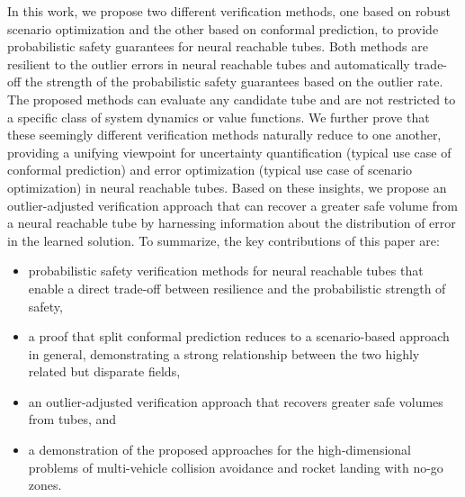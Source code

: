 In this work, we propose two different verification methods, one based on robust scenario optimization and the other based on conformal prediction, to provide probabilistic safety guarantees for neural reachable tubes.
Both methods are resilient to the outlier errors in neural reachable tubes and automatically trade-off the strength of the probabilistic safety guarantees based on the outlier rate.
The proposed methods can evaluate any candidate tube and are not restricted to a specific class of system dynamics or value functions.
We further prove that these seemingly different verification methods naturally reduce to one another, providing a unifying viewpoint for uncertainty quantification (typical use case of conformal prediction) and error optimization (typical use case of scenario optimization) in neural reachable tubes.
Based on these insights, we propose an outlier-adjusted verification approach that can recover a greater safe volume from a neural reachable tube by harnessing information about the distribution of error in the learned solution.
To summarize, the key contributions of this paper are:
\begin{itemize}
    \item probabilistic safety verification methods for neural reachable tubes that enable a direct trade-off between resilience and the probabilistic strength of safety,
    \item a proof that split conformal prediction reduces to a scenario-based approach in general, demonstrating a strong relationship between the two highly related but disparate fields,
    \item an outlier-adjusted verification approach that recovers greater safe volumes from tubes, and
    \item a demonstration of the proposed approaches for the high-dimensional problems of multi-vehicle collision avoidance and rocket landing with no-go zones.
\end{itemize}
